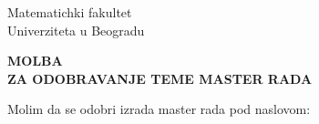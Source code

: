 \documentclass[a4paper]{article}
\begin{document}
\thispagestyle{empty}

\selectfont

\begin{flushleft}
Matematichki fakultet\\
Univerziteta u Beogradu
\end{flushleft}

\bigskip

\begin{center}
\textbf{MOLBA\\
ZA ODOBRAVANJE TEME MASTER RADA
}\end{center}

\bigskip

\begin{flushleft}
Molim da se odobri izrada master rada pod naslovom:
\end{flushleft}
\end{document}
